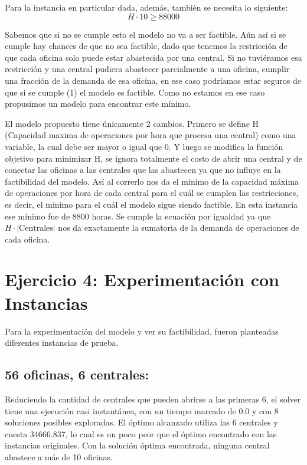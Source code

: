 \documentclass{article}
\begin{document}
Para la instancia en particular dada, además, también se necesita lo siguiente:
\[
H \cdot 10 \geq 88000
\]

Sabemos que si no se cumple esto el modelo no va a ser factible. Aún así si se cumple hay chances de que no sea factible, dado que tenemos la restricción de que cada oficina solo puede estar abastecida por una central. Si no tuviéramos esa restricción y una central pudiera abastecer parcialmente a una oficina, cumplir una fracción de la demanda de esa oficina, en ese caso podríamos estar seguros de que si se cumple (1) el modelo es factible. Como no estamos en ese caso propusimos un modelo para encontrar este mínimo.

El modelo propuesto tiene únicamente 2 cambios. Primero se define H (Capacidad maxima de operaciones por hora que procesa una central) como una variable, la cual debe ser mayor o igual que 0. Y luego se modifica la función objetivo para minimizar H, se ignora totalmente el costo de abrir una central y de conectar las oficinas a las centrales que las abastecen ya que no influye en la factibilidad del modelo. Así al correrlo nos da el mínimo de la capacidad máxima de operaciones por hora de cada central para el cuál se cumplen las restricciones, es decir, el mínimo para el cuál el modelo sigue siendo factible. En esta instancia ese mínimo fue de 8800 horas. Se cumple la ecuación por igualdad ya que \( H \cdot \lvert \text{Centrales} \rvert \) nos da exactamente la sumatoria de la demanda de operaciones de cada oficina.


\section*{Ejercicio 4: Experimentación con Instancias}
Para la experimentación del modelo y ver su factibilidad, fueron planteadas diferentes instancias de prueba. 

\subsection*{56 oficinas, 6 centrales:}
Reduciendo la cantidad de centrales que pueden abrirse a las primeras 6, el solver tiene una ejecución casi instantánea, con un tiempo marcado de 0.0 y con 8 soluciones posibles exploradas. El óptimo alcanzado utiliza las 6 centrales y cuesta 34666.837, lo cual es un poco peor que el óptimo encontrado con las instancias originales. Con la solución óptima encontrada, ninguna central abastece a más de 10 oficinas.
\end{document}

